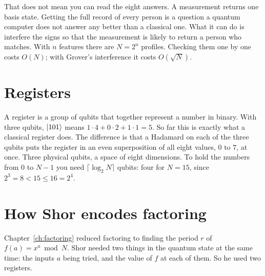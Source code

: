 That does not mean you can read the eight answers. A measurement returns one basis
state. Getting the full record of every person is a question a quantum computer
does not answer any better than a classical one. What it can do is interfere the
signs so that the measurement is likely to return a person who matches. With $n$
features there are $N = 2^n$ profiles. Checking them one by one costs $O(N)$; with
Grover's interference it costs $O(\sqrt N)$.

\section{Registers}

A register is a group of qubits that together represent a number in binary. With
three qubits, $\ket{101}$ means $1\cdot4 + 0\cdot2 + 1\cdot1 = 5$. So far this is
exactly what a classical register does. The difference is that a Hadamard on each
of the three qubits puts the register in an even superposition of all eight
values, $0$ to $7$, at once. Three physical qubits, a space of eight dimensions.
To hold the numbers from $0$ to $N - 1$ you need $\lceil \log_2 N \rceil$ qubits:
four for $N = 15$, since $2^3 = 8 < 15 \leq 16 = 2^4$.

\section{How Shor encodes factoring}

Chapter~\ref{ch:factoring} reduced factoring to finding the period $r$ of $f(a) = x^a \bmod N$. Shor
needed two things in the quantum state at the same time: the inputs $a$ being
tried, and the value of $f$ at each of them. So he used two registers.

